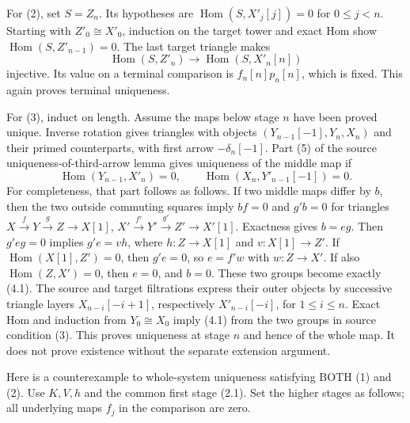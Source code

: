\documentclass[11pt]{article}
\begin{document}
For (2)\allowbreak{},\allowbreak{} set \(S=Z_n\). Its hypotheses are \(\operatorname{Hom}(S,X'_j[j])=0\) for \(0\leq j<n\). Starting with \(Z'_0\cong X'_0\),\allowbreak{} induction on the target tower and exact Hom show \(\operatorname{Hom}(S,Z'_{n-1})=0\). The last target triangle makes \[
\operatorname{Hom}(S,Z'_n)\longrightarrow\operatorname{Hom}(S,X'_n[n])
\] injective. Its value on a terminal comparison is \(f_n[n]p_n[n]\),\allowbreak{} which is fixed. This again proves terminal uniqueness.

For (3)\allowbreak{},\allowbreak{} induct on length. Assume the maps below stage \(n\) have been proved unique. Inverse rotation gives triangles with objects \((Y_{n-1}[-1],Y_n,X_n)\) and their primed counterparts,\allowbreak{} with first arrow \(-\delta_n[-1]\). Part (5)\allowbreak{} of the source uniqueness-of-third-arrow lemma gives uniqueness of the middle map if \[
\operatorname{Hom}(Y_{n-1},X'_n)=0,\qquad
\operatorname{Hom}(X_n,Y'_{n-1}[-1])=0. \tag{4.1}
\] For completeness,\allowbreak{} that part follows as follows. If two middle maps differ by \(b\),\allowbreak{} then the two outside commuting squares imply \(bf=0\) and \(g'b=0\) for triangles \(X\xrightarrow fY\xrightarrow gZ\to X[1]\),\allowbreak{} \(X'\xrightarrow {f'}Y'\xrightarrow {g'}Z'\to X'[1]\). Exactness gives \(b=eg\). Then \(g'eg=0\) implies \(g'e=vh\),\allowbreak{} where \(h:Z\to X[1]\) and \(v:X[1]\to Z'\). If \(\operatorname{Hom}(X[1],Z')=0\),\allowbreak{} then \(g'e=0\),\allowbreak{} so \(e=f'w\) with \(w:Z\to X'\). If also \(\operatorname{Hom}(Z,X')=0\),\allowbreak{} then \(e=0\),\allowbreak{} and \(b=0\). These two groups become exactly (4.1)\allowbreak{}. The source and target filtrations express their outer objects by successive triangle layers \(X_{n-i}[-i+1]\),\allowbreak{} respectively \(X'_{n-i}[-i]\),\allowbreak{} for \(1\leq i\leq n\). Exact Hom and induction from \(Y_0\cong X_0\) imply (4.1)\allowbreak{} from the two groups in source condition (3)\allowbreak{}. This proves uniqueness at stage \(n\) and hence of the whole map. It does not prove existence without the separate extension argument.

Here is a counterexample to whole-system uniqueness satisfying BOTH (1)\allowbreak{} and (2)\allowbreak{}. Use \(K,V,h\) and the common first stage (2.1)\allowbreak{}. Set the higher stages as follows; all underlying maps \(f_j\) in the comparison are zero.
\end{document}
